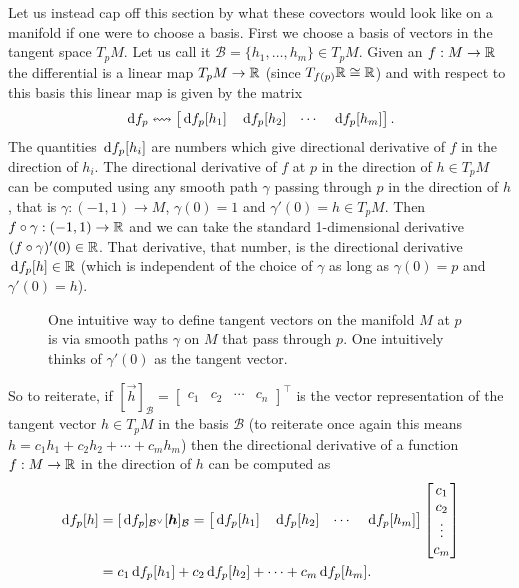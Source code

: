 \documentclass[12pt]{amsart}
\begin{document}
Let us instead cap off this section by what these covectors would look like on a manifold if one were to choose a basis. First we choose a basis of vectors in the tangent space $T_p M$. Let us call it $\mathcal{B} = \{h_1, \ldots, h_m\} \in T_pM$. Given an $f : M \to \mathbb{R}$ the differential is a linear map $T_pM \to \mathbb{R}$ (since $T_{f(p)}\mathbb{R} \cong \mathbb{R}$) and with respect to this basis this linear map is given by the matrix 
\[
	\,\mathrm{d} f_p \leftrightsquigarrow  \begin{bmatrix} \,\mathrm{d} f_p[h_1] & \,\mathrm{d} f_p[h_2]& \cdots & \,\mathrm{d} f_p[h_m] \end{bmatrix}.
\]
The quantities $\,\mathrm{d} f_p[h_i]$ are numbers which give directional derivative of $f$ in the direction of $h_i$. The directional derivative of $f$ at $p$ in the direction of $h\in T_pM$ can be computed using any smooth path $\gamma$ passing through $p$ in the direction of $h$, that is $\gamma: (-1,1) \to M$, $\gamma(0) = 1$ and $\gamma'(0) =h \in T_pM$. Then $f \circ \gamma: (-1,1) \to \mathbb{R}$ and we can take the standard 1-dimensional derivative $(f \circ \gamma)'(0) \in \mathbb{R}$. That derivative, that number, is the directional derivative $\,\mathrm{d} f_p [h] \in \mathbb{R}$ (which is independent of the choice of $\gamma$ as long as $\gamma(0) = p$ and $\gamma'(0) = h$). 

\begin{figure}[ht!]
\centering

\caption*{One intuitive way to define tangent vectors on the manifold $M$ at $p$ is via smooth paths $\gamma$ on $M$ that pass through $p$. One intuitively thinks of $\gamma'(0)$ as the tangent vector.}
\end{figure}

So to reiterate, if $[\vec{h}]_{\mathcal{B}} = \begin{bmatrix} c_1 & c_2 & \cdots & c_n \end{bmatrix}^\top$ is the vector representation of the tangent vector $h \in T_pM$ in the basis $\mathcal{B}$ (to reiterate once again this means $h = c_1 h_1 + c_2 h_2 + \cdots + c_m h_m$) then the directional derivative of a function $f : M \to \mathbb{R}$ in the direction of $h$ can be computed as
\begin{align*}
	\,\mathrm{d} f_p [h] &= [\,\mathrm{d} f_p]_{\mathcal{B}^\vee} [\mathbf{\boldsymbol{h}}]_{\mathcal{B}} =  \begin{bmatrix}\,\mathrm{d} f_p[h_1] & \,\mathrm{d} f_p[h_2]& \cdots & \,\mathrm{d} f_p[h_m]  \end{bmatrix} \begin{bmatrix}
	c_1 \\ c_2 \\ \vdots \\ c_m
	\end{bmatrix} \\
	&= c_1 \,\mathrm{d} f_p[h_1] + c_2 \,\mathrm{d} f_p[h_2] + \cdots  + c_m \,\mathrm{d} f_p[h_m] .
\end{align*}
\end{document}
